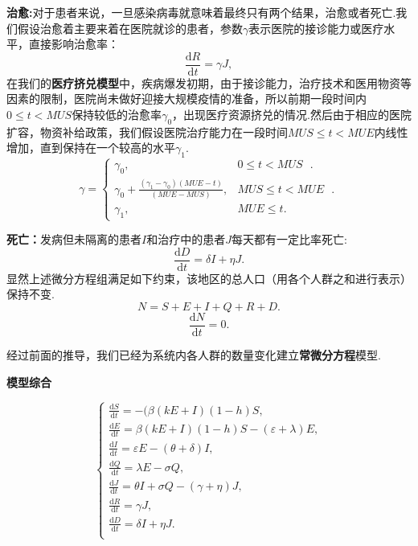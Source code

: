 \documentclass{whutmod}
\begin{document}
\quad
\textbf{治愈:}对于患者来说，一旦感染病毒就意味着最终只有两个结果，治愈或者死亡.我们假设治愈着主要来着在医院就诊的患者，参数$\gamma$表示医院的接诊能力或医疗水平，直接影响治愈率：
\begin{equation}
\frac{\mathrm{d}R}{\mathrm{d}t}=\gamma J,
\end{equation}
在我们的\textbf{医疗挤兑模型}中，疾病爆发初期，由于接诊能力，治疗技术和医用物资等因素的限制，医院尚未做好迎接大规模疫情的准备，所以前期一段时间内$0\le t<MUS$保持较低的治愈率$\gamma_0$，出现医疗资源挤兑的情况.然后由于相应的医院扩容，物资补给政策，我们假设医院治疗能力在一段时间$MUS\le t<MUE$内线性增加，直到保持在一个较高的水平$\gamma_1$.
\begin{equation}
	\gamma=\begin{cases}
		\gamma_0,&\text{$0\le t<MUS$ }.\\
		\gamma_0+\frac{(\gamma_1-\gamma_0)(MUE-t)}{(MUE-MUS)},&\text{$MUS\le t<MUE$ }.\\
		\gamma_1,& \text{$MUE \le t$}.
		\end{cases}
\end{equation}

\textbf{死亡：}发病但未隔离的患者$I$和治疗中的患者$J$每天都有一定比率死亡:
\begin{equation}
\frac{\mathrm{d}D}{\mathrm{d}t}=\delta I+\eta J.
\end{equation}
显然上述微分方程组满足如下约束，该地区的总人口（用各个人群之和进行表示）保持不变.
\begin{equation}
N=S+E+I+Q+R+D.
\end{equation}
\begin{equation}
\frac{\mathrm{d}N}{\mathrm{d}t}=0.
\end{equation}

经过前面的推导，我们已经为系统内各人群的数量变化建立\textbf{常微分方程}模型.

\textbf{模型综合}

 \begin{equation}\left\{
	 \begin{array}{l}
	\frac{\mathrm{d}S}{\mathrm{d}t}=-(\beta(kE+I)(1-h)S,\\
	\frac{\mathrm{d}E}{\mathrm{d}t}=\beta(kE+I)(1-h)S-(\varepsilon+\lambda)E,\\
	\frac{\mathrm{d}I}{\mathrm{d}t}=\varepsilon E-(\theta+\delta)I,\\
	\frac{\mathrm{d}Q}{\mathrm{d}t}=\lambda E-\sigma Q,\\
	\frac{\mathrm{d}J}{\mathrm{d}t}=\theta I+\sigma Q-(\gamma+\eta)J,
		\\
	\frac{\mathrm{d}R}{\mathrm{d}t}=\gamma J,\\
	\frac{\mathrm{d}D}{\mathrm{d}t}=\delta I+\eta J.\\
	
	\end{array}\right.
  \end{equation}
\end{document}

